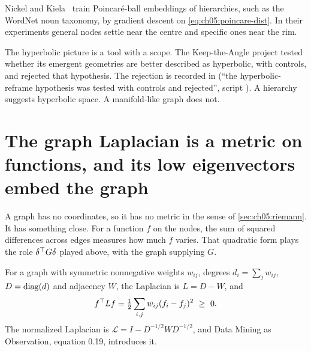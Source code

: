 Nickel and Kiela~\cite{nickel2017} train Poincar\'e-ball embeddings of hierarchies, such as the WordNet noun taxonomy, by gradient descent on \eqref{eq:ch05:poincare-dist}. In their experiments general nodes settle near the centre and specific ones near the rim.

The hyperbolic picture is a tool with a scope. The Keep-the-Angle project tested whether its emergent geometries are better described as hyperbolic, with controls, and rejected that hypothesis. The rejection is recorded in  (``the hyperbolic-reframe hypothesis was tested with controls and rejected'', script ). A hierarchy suggests hyperbolic space. A manifold-like graph does not.



\section{The graph Laplacian is a metric on functions, and its low eigenvectors embed the graph}\label{sec:ch05:laplacian}

A graph has no coordinates, so it has no metric in the sense of \cref{sec:ch05:riemann}. It has something close. For a function $f$ on the nodes, the sum of squared differences across edges measures how much $f$ varies. That quadratic form plays the role $\delta^{\top} G\delta$ played above, with the graph supplying $G$.

\begin{definition}\label{def:ch05:laplacian}
For a graph with symmetric nonnegative weights $w_{ij}$, degrees $d_i=\sum_jw_{ij}$, $D=\operatorname{diag}(d)$ and adjacency $W$, the Laplacian is $L=D-W$, and
\begin{equation}\label{eq:ch05:laplacian}
f^{\top} Lf=\tfrac12\sum_{i,j}w_{ij}(f_i-f_j)^2\ \ge\ 0.
\end{equation}
The normalized Laplacian is $\mathcal L=I-D^{-1/2}WD^{-1/2}$, and Data Mining as Observation, equation 0.19, introduces it.
\end{definition}

